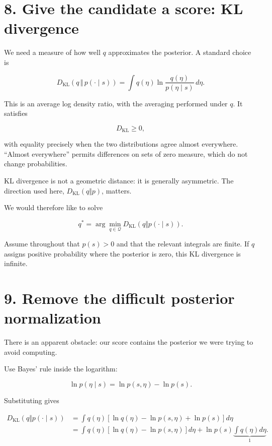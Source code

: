 \documentclass[
  letterpaper,
  DIV=11,
  numbers=noendperiod]{scrreprt}
\begin{document}
\section{8. Give the candidate a score: KL
divergence}\label{give-the-candidate-a-score-kl-divergence}

We need a measure of how well \(q\) approximates the posterior. A
standard choice is

\[
D_{\mathrm{KL}}\!\left(q\,\Vert\,p(\cdot\mid s)\right)
=\int q(\eta)\ln\frac{q(\eta)}{p(\eta\mid s)}\,d\eta.
\]

This is an average log density ratio, with the averaging performed under
\(q\). It satisfies

\[
D_{\mathrm{KL}}\geq 0,
\]

with equality precisely when the two distributions agree almost
everywhere. ``Almost everywhere'' permits differences on sets of zero
measure, which do not change probabilities.

KL divergence is not a geometric distance: it is generally asymmetric.
The direction used here, \(D_{\mathrm{KL}}(q\Vert p)\), matters.

We would therefore like to solve

\[
q^*=\arg\min_{q\in\mathcal Q}
D_{\mathrm{KL}}\!\left(q\Vert p(\cdot\mid s)\right).
\]

Assume throughout that \(p(s)>0\) and that the relevant integrals are
finite. If \(q\) assigns positive probability where the posterior is
zero, this KL divergence is infinite.

\section{9. Remove the difficult posterior
normalization}\label{remove-the-difficult-posterior-normalization}

There is an apparent obstacle: our score contains the posterior we were
trying to avoid computing.

Use Bayes' rule inside the logarithm:

\[
\ln p(\eta\mid s)=\ln p(s,\eta)-\ln p(s).
\]

Substituting gives

\[
\begin{aligned}
D_{\mathrm{KL}}\!\left(q\Vert p(\cdot\mid s)\right)
&=\int q(\eta)
\left[\ln q(\eta)-\ln p(s,\eta)+\ln p(s)\right]d\eta\\
&=\int q(\eta)\left[\ln q(\eta)-\ln p(s,\eta)\right]d\eta
+\ln p(s)\underbrace{\int q(\eta)d\eta}_{1}.
\end{aligned}
\]
\end{document}
